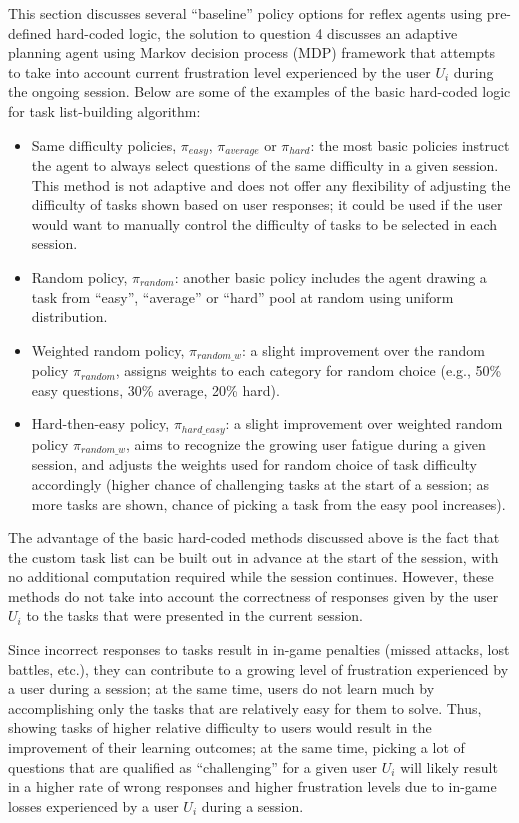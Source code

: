 This section discusses several ``baseline'' policy options for reflex agents using pre-defined hard-coded logic, the solution to question 4 discusses an adaptive planning agent using Markov decision process (MDP) framework that attempts to take into account current frustration level experienced by the user $U_i$ during the ongoing session.
Below are some of the examples of the basic hard-coded logic for task list-building algorithm:

\begin{itemize}
    \item Same difficulty policies, $\pi_{easy}$, $\pi_{average}$ or $\pi_{hard}$: the most basic policies instruct the agent to always select questions of the same difficulty in a given session.
    This method is not adaptive and does not offer any flexibility of adjusting the difficulty of tasks shown based on user responses;
    it could be used if the user would want to manually control the difficulty of tasks to be selected in each session.
    \item Random policy, $\pi_{random}$: another basic policy includes the agent drawing a task from ``easy'', ``average'' or ``hard'' pool at random using uniform distribution.
    \item Weighted random policy, $\pi_{random\_w}$: a slight improvement over the random policy $\pi_{random}$, assigns weights to each category for random choice (e.g., 50\% easy questions, 30\% average, 20\% hard).
    \item Hard-then-easy policy, $\pi_{hard\_easy}$: a slight improvement over weighted random policy $\pi_{random\_w}$, aims to recognize the growing user fatigue during a given session, and adjusts the weights used for random choice of task difficulty accordingly (higher chance of challenging tasks at the start of a session;
    as more tasks are shown, chance of picking a task from the easy pool increases).
\end{itemize}

The advantage of the basic hard-coded methods discussed above is the fact that the custom task list can be built out in advance at the start of the session, with no additional computation required while the session continues.
However, these methods do not take into account the correctness of responses given by the user $U_i$ to the tasks that were presented in the current session.

Since incorrect responses to tasks result in in-game penalties (missed attacks, lost battles, etc.), they can contribute to a growing level of frustration experienced by a user during a session;
at the same time, users do not learn much by accomplishing only the tasks that are relatively easy for them to solve.
Thus, showing tasks of higher relative difficulty to users would result in the improvement of their learning outcomes;
at the same time, picking a lot of questions that are qualified as ``challenging'' for a given user $U_i$ will likely result in a higher rate of wrong responses and higher frustration levels due to in-game losses experienced by a user $U_i$ during a session.

